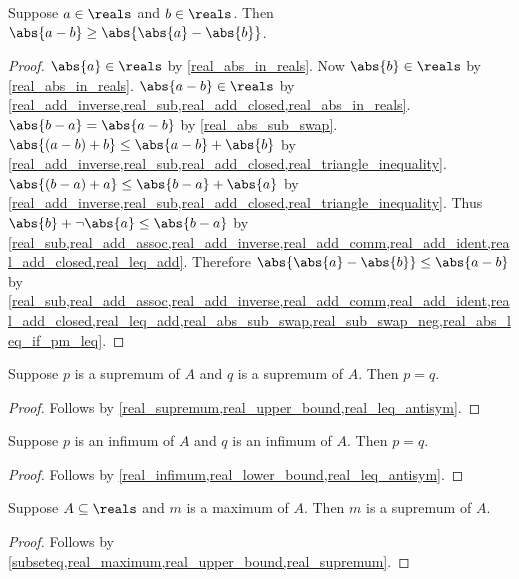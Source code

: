 \begin{proposition}\label{real_reverse_triangle_inequality}
    Suppose $a\in\reals$ and $b\in\reals$.
    Then $\abs{a - b} \geq \abs{\abs{a} - \abs{b}}$.
\end{proposition}
\begin{proof}
    $\abs{a}\in\reals$ by \cref{real_abs_in_reals}.
    Now $\abs{b}\in\reals$ by \cref{real_abs_in_reals}.
    $\abs{a - b}\in\reals$ by \cref{real_add_inverse,real_sub,real_add_closed,real_abs_in_reals}.
    $\abs{b - a} = \abs{a - b}$ by \cref{real_abs_sub_swap}.
    $\abs{(a - b) + b} \leq \abs{a - b} + \abs{b}$ by \cref{real_add_inverse,real_sub,real_add_closed,real_triangle_inequality}.
    $\abs{(b - a) + a} \leq \abs{b - a} + \abs{a}$ by \cref{real_add_inverse,real_sub,real_add_closed,real_triangle_inequality}.
    Thus $\abs{b} + \neg{\abs{a}} \leq \abs{b - a}$ by \cref{real_sub,real_add_assoc,real_add_inverse,real_add_comm,real_add_ident,real_add_closed,real_leq_add}.
    Therefore $\abs{\abs{a} - \abs{b}} \leq \abs{a - b}$ by \cref{real_sub,real_add_assoc,real_add_inverse,real_add_comm,real_add_ident,real_add_closed,real_leq_add,real_abs_sub_swap,real_sub_swap_neg,real_abs_leq_if_pm_leq}.
\end{proof}

\begin{proposition}\label{real_supremum_unique}
    Suppose $p$ is a supremum of $A$ and $q$ is a supremum of $A$.
    Then $p = q$.
\end{proposition}
\begin{proof}
    Follows by \cref{real_supremum,real_upper_bound,real_leq_antisym}.
\end{proof}

\begin{proposition}\label{real_infimum_unique}
    Suppose $p$ is an infimum of $A$ and $q$ is an infimum of $A$.
    Then $p = q$.
\end{proposition}
\begin{proof}
    Follows by \cref{real_infimum,real_lower_bound,real_leq_antisym}.
\end{proof}

\begin{proposition}\label{real_maximum_is_supremum}
    Suppose $A\subseteq\reals$ and $m$ is a maximum of $A$.
    Then $m$ is a supremum of $A$.
\end{proposition}
\begin{proof}
    Follows by \cref{subseteq,real_maximum,real_upper_bound,real_supremum}.
\end{proof}


